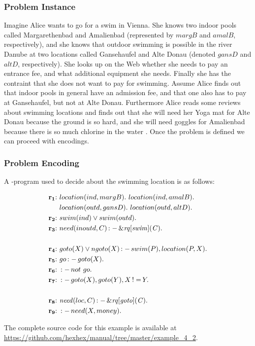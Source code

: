 \documentclass[a4paper, titlepage]{article}
\newcommand{\ext}[3]{\ensuremath{\&{\mathit{#1}}[#2](#3)}}
\DeclareMathOperator{\leftimpl}{:-}
\DeclareMathOperator{\noteq}{!=}
\newcommand{\examplelink}[1]{\url{https://github.com/hexhex/manual/tree/master/#1}}
\newcommand{\rowprefix}[1]{%
  \ensuremath{\color{black}\mathbf{#1{:}}\ }%
}
\begin{document}
\subsubsection{Problem Instance}
Imagine Alice wants to go for a swim in Vienna. She knows 
two indoor pools called Margarethenbad and Amalienbad 
(represented by $\mathit{margB}$ and $\mathit{amalB}$, 
respectively), and she knows that outdoor swimming is 
possible in the river Danube at two locations called 
Gansehaufel and Alte Donau (denoted $\mathit{gansD}$ and 
$\mathit{altD}$, respectively). She looks up on the Web 
whether she needs to pay an entrance fee, and what 
additional equipment she needs. Finally she has the 
contraint that she does not want to pay for swimming. 
Assume Alice finds out that indoor pools in general have an 
admission fee, and that one also
has to pay at Gansehaufel, but not at Alte Donau. 
Furthermore Alice reads some reviews about swimming 
locations and finds out that she will need her Yoga mat for 
Alte Donau because the ground is so hard, and she will need 
goggles for Amalienbad because there is so much chlorine in 
the water \cite{efikrs2015}. Once the problem is defined we can 
proceed with encodings.    

\subsubsection{Problem Encoding}
A \hex-program used to decide about the swimming location is as 
follows:
\begin{exmp}
\label{swimExample}
\begin{align*}
\rowprefix{r_1}& location(ind, margB). \ location(ind, amalB). \ \\& 
location(outd, gansD). \ location(outd, altD). \\  
\rowprefix{r_2}& swim(ind) \vee swim(outd).\\ 
\rowprefix{r_3}& need(inoutd, C) \leftimpl \ext{\mathit{rq}}
{\mathit{swim}}{\mathit{C}}. \\
\\
\rowprefix{r_4}& goto(X) \vee ngoto(X) \leftimpl swim(P), 
location(P, X).\\
\rowprefix{r_5}& go \leftimpl goto(X).\\
\rowprefix{r_6}& \leftimpl not \ go. \\
\rowprefix{r_7}& \leftimpl goto(X), goto(Y), X \noteq Y. \\
\\
\rowprefix{r_8}& \mathit{need}(loc, C) \leftimpl 
\ext{\mathit{rq}}{\mathit{goto}}{\mathit{C}}. \\ 
\rowprefix{r_9}& \leftimpl need(X, money).
\end{align*}
\end{exmp}
The complete source code for this example is available at \examplelink{example_4_2}.
\end{document}
